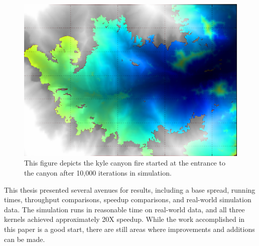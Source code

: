 \begin{figure}%
\centering
  \includegraphics[height=.4\textheight]{figures/results/overlay_7.png}
  \caption{This figure depicts the kyle canyon fire started at the entrance to the canyon after 10,000 iterations in simulation.}
  \label{fig:kyle_10000}
\end{figure} 

This thesis presented several avenues for results, including a base spread, running times, throughput comparisons, speedup comparisons, and real-world simulation data. The simulation runs in reasonable time on real-world data, and all three kernels achieved approximately 20X speedup. While the work accomplished in this paper is a good start, there are still areas where improvements and additions can be made. 

